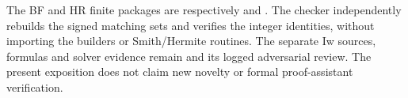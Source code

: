 The BF and HR finite packages are respectively
 and
. The checker
 independently rebuilds
the signed matching sets and verifies the integer identities, without
importing the builders or Smith/Hermite routines. The separate Iw sources,
formulas and solver evidence remain
 and its logged adversarial
review. The present exposition does not claim new novelty or formal
proof-assistant verification.
